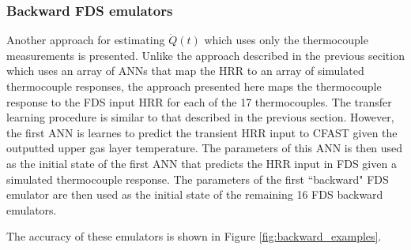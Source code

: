 \documentclass{article}
\begin{document}
\clearpage
\subsubsection{Backward FDS emulators}

Another approach for estimating $\dot{Q}(t)$ which uses only the thermocouple measurements is presented. Unlike the approach described in the previous secition which uses an array of ANNs that map the HRR to an array of simulated thermocouple responses, the approach presented here maps the thermocouple response to the FDS input HRR for each of the 17 thermocouples. The transfer learning procedure is similar to that described in the previous section. However, the first ANN is learnes to predict the transient HRR input to CFAST given the outputted upper gas layer temperature. The parameters of this ANN is then used as the initial state of the first ANN that predicts the HRR input in FDS given a simulated thermocouple response. The parameters of the first ``backward" FDS emulator are then used as the initial state of the remaining 16 FDS backward emulators. 


The accuracy of these emulators is shown in Figure \ref{fig:backward_examples}.
\end{document}
